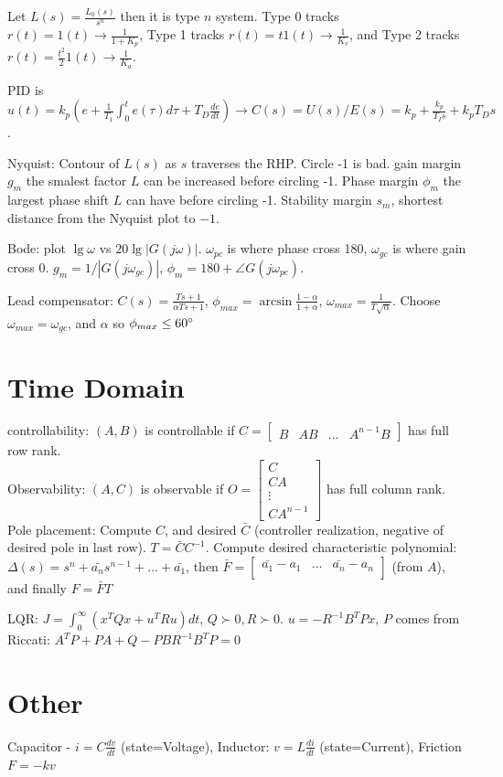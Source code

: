 \documentclass[11pt]{article}
\begin{document}
Let $L(s) = \frac{L_0(s)}{s^n}$ then it is type $n$ system. Type 0 tracks $r(t) = 1(t) \to \frac{1}{1 + K_p}$,
Type 1 tracks $r(t) = t1(t) \to \frac{1}{K_v}$, and Type 2 tracks $r(t) = \frac{t^2}{2}1(t) \to \frac{1}{K_a}$.

PID is $u(t) = k_p (e + \frac{1}{T_1}\int_0^t e(\tau) d\tau + T_D \frac{de}{dt}) \to C(s) = U(s)/E(s) = k_p + \frac{k_p}{T_Is} + k_p T_D s$.

Nyquist: Contour of $L(s)$ as $s$ traverses the RHP. Circle -1 is bad.
gain margin $g_m$ the smalest factor $L$ can be increased before circling -1.
Phase margin $\phi_m$ the largest phase shift $L$ can have before circling -1.
Stability margin $s_m$, shortest distance from the Nyquist plot to $-1$.

Bode: plot $\lg \omega$ vs $20 \lg |G(j\omega)|$. $\omega_{pc}$ is where phase cross 180,
$\omega_{gc}$ is where gain cross 0. $g_m = 1/|G(j\omega_{gc})|$, $\phi_m = 180 + \angle G(j\omega_{pc})$.

Lead compensator: $C(s) = \frac{Ts + 1}{\alpha T s + 1}$, $\phi_{max} = \arcsin \frac{1 - \alpha}{1 + \alpha}$, $\omega_{max} = \frac{1}{T\sqrt{\alpha}}$.
Choose $\omega_{max} = \omega_{gc}$, and $\alpha$ so $\phi_{max} \leq 60\degree$

\section{Time Domain}
controllability: $(A,B)$ is controllable if $C = \begin{bmatrix}
    B & AB & \dots & A^{n-1}B
\end{bmatrix}$ has full row rank.\\
Observability: $(A,C)$ is observable if $O = \begin{bmatrix}
    C \\ CA \\ \vdots \\ CA^{n-1}
\end{bmatrix}$ has full column rank.\\

Pole placement: Compute $C$, and desired $\bar{C}$ (controller realization, negative of desired pole in last row).
$T = \bar{C}C^{-1}$. Compute desired characteristic polynomial: $\Delta(s) = s^n + \bar{a_n}s^{n-1} + \dots + \bar{a_1}$,
then $\bar{F} = \begin{bmatrix}
    \bar{a_1} - a_1 & \dots & \bar{a_n} - a_n \\
\end{bmatrix}$ (from $A$), and finally $F = \bar{F}T$

LQR: $J = \int_0^\infty (x^T Q x + u^T R u) dt$, $Q \succ 0, R \succ 0$. $u = -R^{-1}B^T Px$, $P$ comes from Riccati: $A^T P + PA + Q - PBR^{-1}B^TP = 0$
\section{Other}

Capacitor - $i = C \frac{dv}{dt}$ (state=Voltage), Inductor: $v = L \frac{di}{dt}$ (state=Current), Friction $F = -k v$
\end{document}
